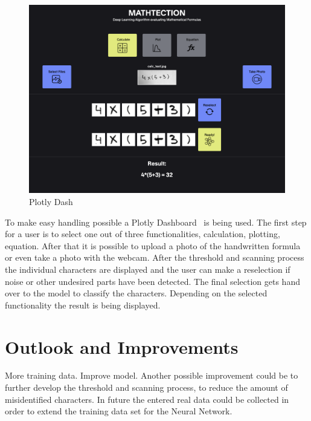 \documentclass[@CLASSOPTIONS@]{tumarticle}
\begin{document}
\begin{figure}
    \begin{minipage}{0.48\textwidth}
     \centering
     \includegraphics[width=.9\linewidth]{figures/dash}
     \caption{Plotly Dash}\label{Fig:Dash}
   \end{minipage}
\end{figure}

To make easy handling possible a Plotly Dashboard~\cite{plotly} is being used.
The first step for a user is to select one out of three functionalities,
calculation, plotting, equation.
After that it is possible to upload a photo of the handwritten formula or even take a photo
with the webcam.
After the threshold and scanning process the individual characters are displayed
and the user can make a reselection if noise or other undesired parts have been detected.
The final selection gets hand over to the model to classify the characters.
Depending on the selected functionality the result is being displayed.

\section{Outlook and Improvements}

More training data.
Improve model.
Another possible improvement could be to further develop the threshold and scanning process,
to reduce the amount of misidentified characters.
In future the entered real data could be collected in order to extend the training data set for the
Neural Network.
\end{document}
